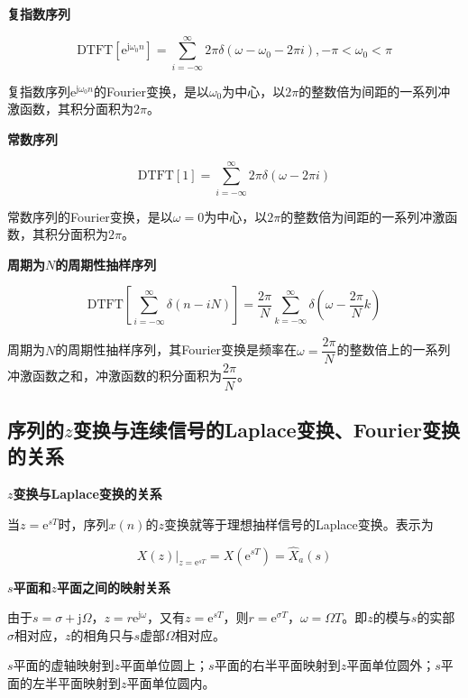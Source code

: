 \documentclass[cn, hazy, blue, normal, 14pt]{elegantnote}
\begin{document}
\textbf{复指数序列}

\begin{equation}
    \text{DTFT}[\text{e}^{\text{j}\omega_0 n}]=\sum_{i=-\infty}^{\infty}{2\pi\delta(\omega-\omega_0-2\pi i)}, -\pi<\omega_0<\pi
\end{equation}

复指数序列$\text{e}^{\text{j}\omega_0 n}$的Fourier变换，是以$\omega_0$为中心，以$2\pi$的整数倍为间距的一系列冲激函数，其积分面积为$2\pi$。

\textbf{常数序列}

\begin{equation}
    \text{DTFT}[1]=\sum_{i=-\infty}^{\infty}{2\pi\delta(\omega-2\pi i)}
\end{equation}

常数序列的Fourier变换，是以$\omega=0$为中心，以$2\pi$的整数倍为间距的一系列冲激函数，其积分面积为$2\pi$。

\textbf{周期为$N$的周期性抽样序列}

\begin{equation}
    \text{DTFT}\left[\sum_{i=-\infty}^{\infty}{\delta(n-iN)}\right]=\frac{2\pi}{N}\sum_{k=-\infty}^{\infty}{\delta\left(\omega-\frac{2\pi}{N}k\right)}
\end{equation}

周期为$N$的周期性抽样序列，其Fourier变换是频率在$\omega=\dfrac{2\pi}{N}$的整数倍上的一系列冲激函数之和，冲激函数的积分面积为$\dfrac{2\pi}{N}$。

\subsection{序列的$z$变换与连续信号的Laplace变换、Fourier变换的关系}

\textbf{$z$变换与Laplace变换的关系}

当$z=\text{e}^{sT}$时，序列$x(n)$的$z$变换就等于理想抽样信号的Laplace变换。表示为

\begin{equation}
        \left.X(z)\right|_{z=\text{e}^{sT}}=X\left(\text{e}^{sT}\right)=\hat{X}_a (s)
\end{equation}

\textbf{$s$平面和$z$平面之间的映射关系}

由于$s=\sigma+\text{j}\Omega$，$z=r\text{e}^{\text{j}\omega}$，又有$z=\text{e}^{sT}$，则$r=\text{e}^{\sigma T}$，$\omega=\Omega T$。即$z$的模与$s$的实部$\sigma$相对应，$z$的相角只与$s$虚部$\Omega$相对应。

$s$平面的虚轴映射到$z$平面单位圆上；$s$平面的右半平面映射到$z$平面单位圆外；$s$平面的左半平面映射到$z$平面单位圆内。
\end{document}
